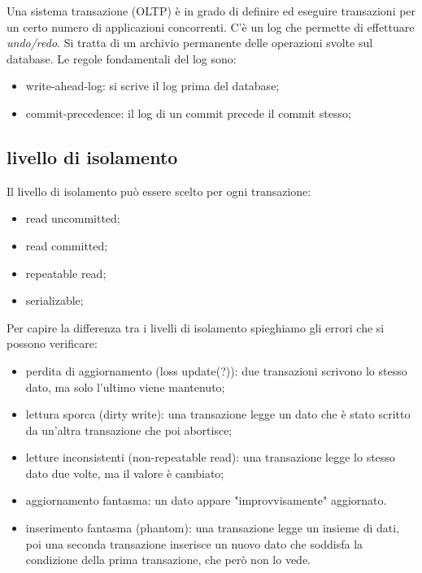 \documentclass{article}
\begin{document}
Una sistema transazione (OLTP) è in grado di definire ed eseguire transazioni
per un certo numero di applicazioni concorrenti. C'è un log che permette di
effettuare \textit{undo/redo}. Si tratta di un archivio permanente delle
operazioni svolte sul database. Le regole fondamentali del log sono:
\begin{itemize}
	\item write-ahead-log: si scrive il log prima del database;

	\item commit-precedence: il log di un commit precede il commit stesso;
\end{itemize}

\subsection{livello di isolamento}
Il livello di isolamento può essere scelto per ogni transazione:
\begin{itemize}
	\item read uncommitted;

	\item read committed;

	\item repeatable read;

	\item serializable;
\end{itemize}

Per capire la differenza tra i livelli di isolamento spieghiamo gli errori che
si possono verificare:
\begin{itemize}
	\item perdita di aggiornamento (loss update(?)): due transazioni scrivono lo
		stesso dato, ma solo l'ultimo viene mantenuto;

	\item lettura sporca (dirty write): una transazione legge un dato che è
		stato scritto da un'altra transazione che poi abortisce;

	\item letture inconsistenti (non-repeatable read): una transazione legge
		lo stesso dato due volte, ma il valore è cambiato;

	\item aggiornamento fantasma: un dato appare "improvvisamente" aggiornato.

	\item inserimento fantasma (phantom): una transazione legge un insieme di 
		dati, poi una seconda transazione inserisce un nuovo dato che soddisfa 
		la condizione della prima transazione, che però non lo vede.
\end{itemize}
\end{document}
